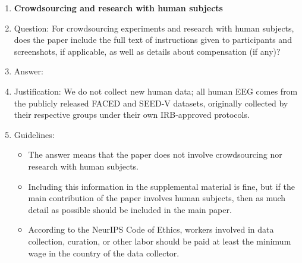 \begin{enumerate}
\item {\bf Crowdsourcing and research with human subjects}
    \item[] Question: For crowdsourcing experiments and research with human subjects, does the paper include the full text of instructions given to participants and screenshots, if applicable, as well as details about compensation (if any)?
    \item[] Answer: \answerNA{}
    \item[] Justification: We do not collect new human data; all human EEG comes from the publicly released FACED \citep{chen2023faced} and SEED-V \citep{liu2022seedv} datasets, originally collected by their respective groups under their own IRB-approved protocols.
    \item[] Guidelines:
    \begin{itemize}
        \item The answer \answerNA{} means that the paper does not involve crowdsourcing nor research with human subjects.
        \item Including this information in the supplemental material is fine, but if the main contribution of the paper involves human subjects, then as much detail as possible should be included in the main paper.
        \item According to the NeurIPS Code of Ethics, workers involved in data collection, curation, or other labor should be paid at least the minimum wage in the country of the data collector.
    \end{itemize}


\end{enumerate}
